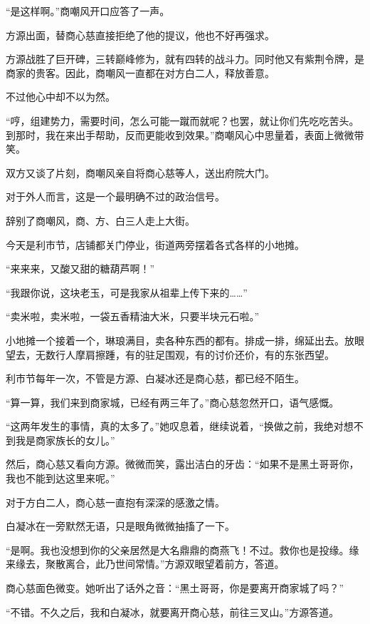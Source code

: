 
\begin{this_body}

“是这样啊。”商嘲风开口应答了一声。

方源出面，替商心慈直接拒绝了他的提议，他也不好再强求。

方源战胜了巨开碑，三转巅峰修为，就有四转的战斗力。同时他又有紫荆令牌，是商家的贵客。因此，商嘲风一直都在对方白二人，释放善意。

不过他心中却不以为然。

“哼，组建势力，需要时间，怎么可能一蹴而就呢？也罢，就让你们先吃吃苦头。到那时，我在来出手帮助，反而更能收到效果。”商嘲风心中思量着，表面上微微带笑。

双方又谈了片刻，商嘲风亲自将商心慈等人，送出府院大门。

对于外人而言，这是一个最明确不过的政治信号。

辞别了商嘲风，商、方、白三人走上大街。

今天是利市节，店铺都关门停业，街道两旁摆着各式各样的小地摊。

“来来来，又酸又甜的糖葫芦啊！”

“我跟你说，这块老玉，可是我家从祖辈上传下来的……”

“卖米啦，卖米啦，一袋五香精油大米，只要半块元石啦。”

小地摊一个接着一个，琳琅满目，卖各种东西的都有。排成一排，绵延出去。放眼望去，无数行人摩肩擦踵，有的驻足围观，有的讨价还价，有的东张西望。

利市节每年一次，不管是方源、白凝冰还是商心慈，都已经不陌生。

“算一算，我们来到商家城，已经有两三年了。”商心慈忽然开口，语气感慨。

“这两年发生的事情，真的太多了。”她叹息着，继续说着，“换做之前，我绝对想不到我是商家族长的女儿。”

然后，商心慈又看向方源。微微而笑，露出洁白的牙齿：“如果不是黑土哥哥你，我也不能到达这里来呢。”

对于方白二人，商心慈一直抱有深深的感激之情。

白凝冰在一旁默然无语，只是眼角微微抽搐了一下。

“是啊。我也没想到你的父亲居然是大名鼎鼎的商燕飞！不过。救你也是投缘。缘来缘去，聚散离合，此乃世间常情。”方源双眼望着前方，答道。

商心慈面色微变。她听出了话外之音：“黑土哥哥，你是要离开商家城了吗？”

“不错。不久之后，我和白凝冰，就要离开商心慈，前往三叉山。”方源答道。


\end{this_body}
